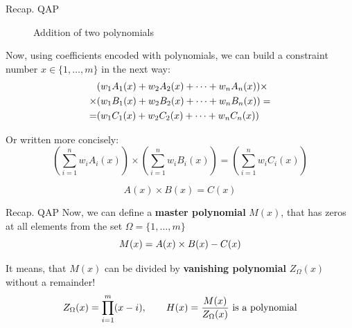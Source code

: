 \documentclass{zkdl-presentation-template}
\begin{document}
\begin{frame}{Recap. QAP}
\begin{figure}[H]
            \caption{Addition of two polynomials}
            \label{fig:example-polynomial-addition}
        \end{figure}
    \end{frame}

    \begin{frame}
        \vspace{-5pt}
        Now, using coefficients encoded with polynomials, we can build a constraint number 
        $x \in \{1, \dots, m\}$ in the next way:
        \vspace{-5pt}
        \begin{align*}
            &(w_1A_1(x) + w_2A_2(x) + \dots + w_nA_n(x)) \times \\
            \times &(w_1B_1(x) + w_2B_2(x) + \dots + w_nB_n(x)) = \\ 
            = &(w_1C_1(x) + w_2C_2(x) + \dots + w_nC_n(x))
            \vspace{-5pt}
        \end{align*}
        
        Or written more concisely:
        \vspace{-5pt}
        \begin{equation*}
            \left( \sum_{i = 1}^{n} w_iA_i(x) \right) \times \left( \sum_{i = 1}^{n} w_iB_i(x) \right) = \left( \sum_{i = 1}^{n} w_iC_i(x) \right)
        \end{equation*}   
        
        \vspace{-5pt}
        \begin{equation*}
            A(x) \times B(x) = C(x)
        \end{equation*}   
    \end{frame}

    \begin{frame}{Recap. QAP}
        Now, we can define a \textbf{master polynomial} $M(x)$, that has zeros at all elements from the set
        $\Omega = \{1,\dots,m\}$
        \vspace{-5pt}
        \begin{equation*}
            M(x) = A(x) \times B(x) - C(x)
            \vspace{-5pt}
        \end{equation*}
        
        It means, that $M(x)$ can be divided by \textbf{vanishing polynomial} $Z_{\Omega}(x)$ without a remainder!
        \vspace{-8pt}
        \begin{equation*}
            Z_{\Omega}(x) = \prod_{i=1}^m (x - i), \qquad \text{$H(x) = \frac{M(x)}{Z_{\Omega}(x)}$ is a polynomial}
            \vspace{-5pt}
        \end{equation*}
    \end{frame}
\end{document}
